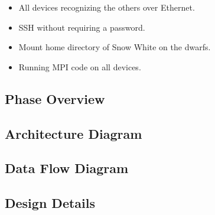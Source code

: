 \begin{itemize}
	\item All devices recognizing the others over Ethernet.
	\item SSH without requiring a password.
	\item Mount home directory of Snow White on the dwarfs.
	\item Running MPI code on all devices.
\end{itemize}


\subsection{Phase Overview}

\subsection{ Architecture  Diagram}


\subsection{Data Flow Diagram}


\subsection{Design Details}

